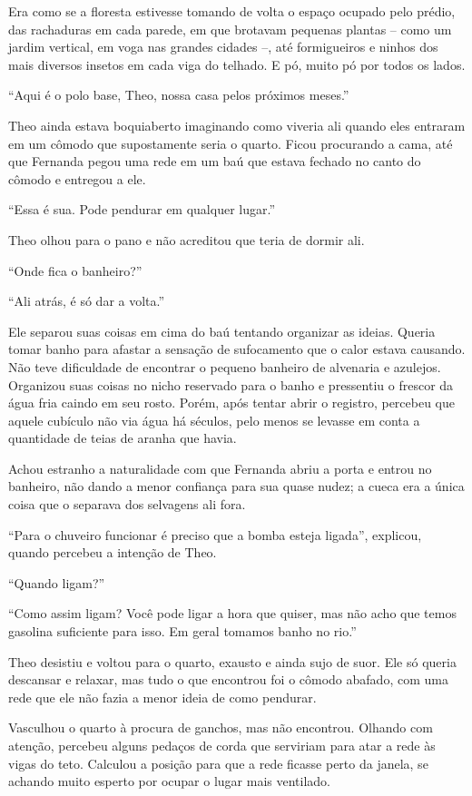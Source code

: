 Era como se a floresta estivesse tomando de volta o espaço ocupado pelo
prédio, das rachaduras em cada parede, em que brotavam pequenas plantas -- como
um jardim vertical, em voga nas grandes
cidades --, até formigueiros e ninhos dos mais diversos insetos em cada viga do
telhado. E pó, muito pó por todos os lados.

``Aqui é o polo base, Theo, nossa casa pelos próximos meses.''

Theo ainda estava boquiaberto imaginando como viveria ali quando eles
entraram em um cômodo que supostamente seria o quarto. Ficou
procurando a cama, até que Fernanda pegou uma rede em um baú
que estava fechado no canto do cômodo e entregou a ele.

``Essa é sua. Pode pendurar em qualquer lugar.''

Theo olhou para o pano e não acreditou que teria de dormir ali.

``Onde fica o banheiro?''

``Ali atrás, é só dar a volta.''

Ele separou suas coisas em cima do baú tentando organizar as ideias.
Queria tomar banho para afastar a sensação de sufocamento que o calor
estava causando. Não teve dificuldade de encontrar o pequeno banheiro de
alvenaria e azulejos. Organizou suas coisas no nicho reservado para o
banho e pressentiu o frescor da água fria caindo em seu rosto. Porém,
após tentar abrir o registro, percebeu que aquele cubículo não via água há
séculos, pelo menos se levasse em conta a quantidade de teias de aranha
que havia.

Achou estranho a naturalidade com que Fernanda abriu a porta e entrou no
banheiro, não dando a menor confiança para sua quase nudez; a cueca era
a única coisa que o separava dos selvagens ali fora.

``Para o chuveiro funcionar é preciso que a bomba esteja ligada'', explicou,
quando percebeu a intenção de Theo.

``Quando ligam?''

``Como assim ligam? Você pode ligar a hora que quiser, mas não acho que
temos gasolina suficiente para isso. Em geral tomamos banho no rio.''

Theo desistiu e voltou para o quarto, exausto e ainda sujo de suor. Ele
só queria descansar e relaxar, mas tudo o que encontrou foi o cômodo
abafado, com uma rede que ele não fazia a menor ideia de como pendurar.

Vasculhou o quarto à procura de ganchos, mas não encontrou. Olhando com
atenção, percebeu alguns pedaços de corda que serviriam para atar a rede
às vigas do teto. Calculou a posição para que a rede ficasse perto da
janela, se achando muito esperto por ocupar o lugar mais ventilado.

